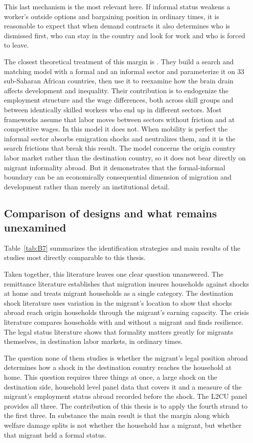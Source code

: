 This last mechanism is the most relevant here. If informal status weakens a worker's outside options and bargaining position in ordinary times, it is reasonable to expect that when demand contracts it also determines who is dismissed first, who can stay in the country and look for work and who is forced to leave.

The closest theoretical treatment of this margin is \cite{docquier2019}. They build a search and matching model with a formal and an informal sector and parameterize it on 33 sub-Saharan African countries, then use it to reexamine how the brain drain affects development and inequality. Their contribution is to endogenize the employment structure and the wage differences, both across skill groups and between identically skilled workers who end up in different sectors. Most frameworks assume that labor moves between sectors without friction and at competitive wages. In this model it does not. When mobility is perfect the informal sector absorbs emigration shocks and neutralizes them, and it is the search frictions that break this result. The model concerns the origin country labor market rather than the destination country, so it does not bear directly on migrant informality abroad. But it demonstrates that the formal-informal boundary can be an economically consequential dimension of migration and development rather than merely an institutional detail.

\subsection{Comparison of designs and what remains unexamined}\label{sec:2-5}

Table~\ref{tab:B7} summarizes the identification strategies and main results of the studies most directly comparable to this thesis.

Taken together, this literature leaves one clear question unanswered. The remittance literature establishes that migration insures households against shocks at home and treats migrant households as a single category. The destination shock literature uses variation in the migrant's location to show that shocks abroad reach origin households through the migrant's earning capacity. The crisis literature compares households with and without a migrant and finds resilience. The legal status literature shows that formality matters greatly for migrants themselves, in destination labor markets, in ordinary times.

The question none of them studies is whether the migrant's legal position abroad determines how a shock in the destination country reaches the household at home. This question requires three things at once, a large shock on the destination side, household level panel data that covers it and a measure of the migrant's employment status abroad recorded before the shock. The L2CU panel provides all three. The contribution of this thesis is to apply the fourth strand to the first three. In substance the main result is that the margin along which welfare damage splits is not whether the household has a migrant, but whether that migrant held a formal status.

